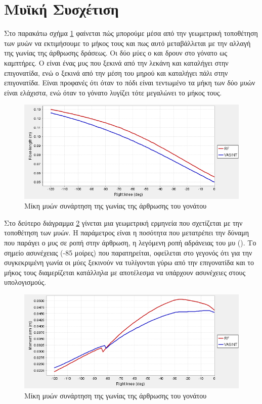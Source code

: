 \section{Μυϊκή Συσχέτιση}

Στο παρακάτω σχήμα \ref{fig:iber-length-vs-knee-angle} φαίνεται πώς μπορούμε μέσα από την γεωμετρική τοποθέτηση των μυών να εκτιμήσουμε το μήκος τους και πως αυτό μεταβάλλεται με την αλλαγή της γωνίας της άρθρωσης δράσεως. Οι δύο μύες ο  και  δρουν στο γόνατο ως καμπτήρες. Ο  είναι ένας μυς που ξεκινά από την λεκάνη και καταλήγει στην επιγονατίδα, ενώ  ο  ξεκινά από την μέση του μηρού και καταλήγει πάλι στην επιγονατίδα. Είναι προφανές ότι όταν το πόδι είναι τεντωμένο τα μήκη των δύο μυών είναι ελάχιστα, ενώ όταν το γόνατο λυγίζει τότε μεγαλώνει το μήκος τους.

\begin{figure}[H]
    \centering
    \includegraphics[width=0.8\linewidth, keepaspectratio]{fig/fiber-length-vs-knee-angle.png}
    \caption{Μίκη μυών συνάρτηση της γωνίας της άρθρωσης του γονάτου}
    \label{fig:iber-length-vs-knee-angle}
\end{figure}

Στο δεύτερο διάγραμμα \ref{fig:moment-arm-vs-knee-angle} γίνεται μια γεωμετρική ερμηνεία που σχετίζεται με την τοποθέτηση των μυών. Η παράμετρος είναι η ποσότητα που μετατρέπει την δύναμη που παράγει ο μυς σε ροπή στην άρθρωση, η λεγόμενη ροπή αδράνειας του μυ (). Το σημείο ασυνέχειας (-85 μοίρες) που παρατηρείται, οφείλεται στο γεγονός ότι για την συγκεκριμένη γωνία οι μύες ξεκινούν να τυλίγονται γύρω από την επιγονατίδα και το μήκος τους διαμερίζεται κατάλληλα με αποτέλεσμα να υπάρχουν ασυνέχειες στους υπολογισμούς.

\begin{figure}[H]
    \centering
    \includegraphics[width=0.8\linewidth, keepaspectratio]{fig/moment-arm-vs-knee-angle.png}
    \caption{Μίκη μυών συνάρτηση της γωνίας της άρθρωσης του γονάτου}
    \label{fig:moment-arm-vs-knee-angle}
\end{figure}

